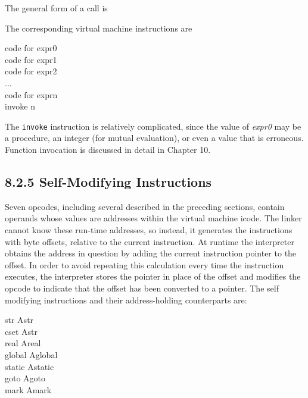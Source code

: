 
The general form of a call is

The corresponding virtual machine instructions are

\begin{iconcode}
\>code for expr0\\
\>code for expr1\\
\>code for expr2\\
\>\>...\\
\>code for exprn\\
\>invoke n
\end{iconcode}

The \texttt{invoke} instruction is relatively complicated, since the
value of \textit{expr0 }may be a procedure, an integer (for mutual
evaluation), or even a value that is erroneous. Function invocation is
discussed in detail in Chapter 10.

\subsection[8.2.5 Self-Modifying Instructions]{8.2.5 Self-Modifying Instructions}

Seven opcodes, including several described in the preceding
sections, contain operands whose values are addresses within the
virtual machine icode. The linker cannot know these run-time
addresses, so instead, it generates the instructions with byte
offsets, relative to the current instruction.  At runtime the
interpreter obtains the address in question by adding the current
instruction pointer to the offset.  In order to avoid repeating this
calculation every time the instruction executes, the interpreter
stores the pointer in place of the offset and modifies the opcode to
indicate that the offset has been converted to a pointer.  The self
modifying instructions and their address-holding counterparts are:

\begin{iconcode}
\>   str    \>\>\>\> Astr \\
\>   cset   \>\>\>\> Astr\\
\>   real   \>\>\>\> Areal\\
\>   global \>\>\>\> Aglobal \\
\>   static \>\>\>\> Astatic\\
\>   goto   \>\>\>\> Agoto\\
\>   mark   \>\>\>\> Amark
\end{iconcode}


